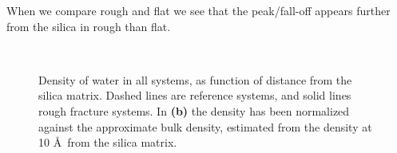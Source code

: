 
When we compare rough and flat we see that the peak/fall-off appears further from the silica in rough than flat.

%
\begin{figure}[!p]%
    \centering%
    \setlength{\myfigwidth}{0.88\textwidth}
    \setlength{\mycaptionwidth}{0.09999\textwidth}
    \begin{minipage}[c]{\myfigwidth}%
    \end{minipage}%
    \begin{minipage}[c]{\mycaptionwidth}%
        \subcaption{}%
    \end{minipage}%
    \\%
    \begin{minipage}[c]{\myfigwidth}%
    \end{minipage}%
    \begin{minipage}[c]{\mycaptionwidth}%
        \subcaption{}%
    \end{minipage}%
    \captionsetup{width=\textwidth}%
    \caption{%
        Density of water in all systems, as function of distance from the silica matrix. Dashed lines are reference systems, and solid lines rough fracture systems. In \textbf{(b)} the density has been normalized against the approximate bulk density, estimated from the density at 10 \AA\ from the silica matrix. %
    }%
\end{figure}%
